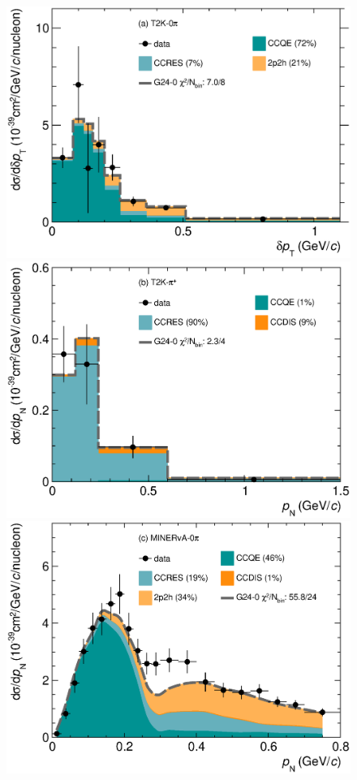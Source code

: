 \begin{figure}
    \includegraphics[width=\dbfigwid\textwidth]{figures/0000-t2k_0pi_dpt_reac_decomp.eps}
    \includegraphics[width=\dbfigwid\textwidth]{figures/0000-t2k_pip_pn_reac_decomp.eps}
    \includegraphics[width=\dbfigwid\textwidth]{figures/0000-min_0pi_pn_reac_decomp.eps}

\end{figure}
